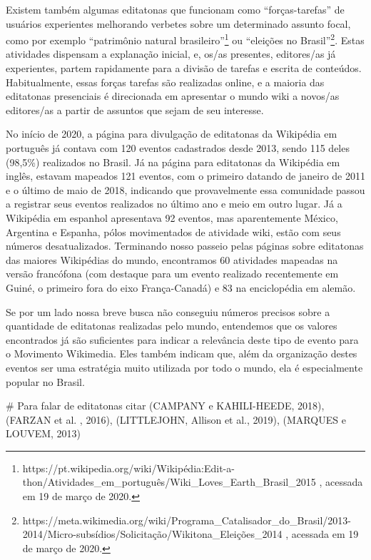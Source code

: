 Existem também algumas editatonas que funcionam como ``forças-tarefas'' de usuários experientes melhorando verbetes sobre um determinado assunto focal, como por exemplo ``patrimônio natural brasileiro''\footnote{https://pt.wikipedia.org/wiki/Wikipédia:Edit-a-thon/Atividades\_em\_português/Wiki\_Loves\_Earth\_Brasil\_2015 , acessada em 19 de março de 2020.} ou ``eleições no Brasil''\footnote{https://meta.wikimedia.org/wiki/Programa\_Catalisador\_do\_Brasil/2013-2014/Micro-subsídios/Solicitação/Wikitona\_Eleições\_2014 , acessada em 19 de março de 2020.}. Estas atividades dispensam a explanação inicial, e, os/as presentes, editores/as já experientes, partem rapidamente para a divisão de tarefas e escrita de conteúdos. Habitualmente, essas forças tarefas são realizadas online, e a maioria das editatonas presenciais é direcionada em apresentar o mundo wiki a novos/as editores/as a partir de assuntos que sejam de seu interesse.

No início de 2020, a página para divulgação de editatonas da Wikipédia em português já contava com 120 eventos cadastrados desde 2013, sendo 115 deles (98,5\%) realizados no Brasil. Já na página para editatonas da Wikipédia em inglês, estavam mapeados 121 eventos, com o primeiro datando de janeiro de 2011 e o último de maio de 2018, indicando que provavelmente essa comunidade passou a registrar seus eventos realizados no último ano e meio em outro lugar. Já a Wikipédia em espanhol apresentava 92 eventos, mas aparentemente México, Argentina e Espanha, pólos movimentados de atividade wiki, estão com seus números desatualizados. Terminando nosso passeio pelas páginas sobre editatonas das maiores Wikipédias do mundo, encontramos 60 atividades mapeadas na versão francófona (com destaque para um evento realizado recentemente em Guiné, o primeiro fora do eixo França-Canadá) e 83 na enciclopédia em alemão.

Se por um lado nossa breve busca não conseguiu números precisos sobre a quantidade de editatonas realizadas pelo mundo, entendemos que os valores encontrados já são suficientes para indicar a relevância deste tipo de evento para o Movimento Wikimedia. Eles também indicam que, além da organização destes eventos ser uma estratégia muito utilizada por todo o mundo, ela é especialmente popular no Brasil.

# Para falar de editatonas citar (CAMPANY e KAHILI-HEEDE, 2018), (FARZAN et al. , 2016), (LITTLEJOHN, Allison et al., 2019), (MARQUES e LOUVEM, 2013)

